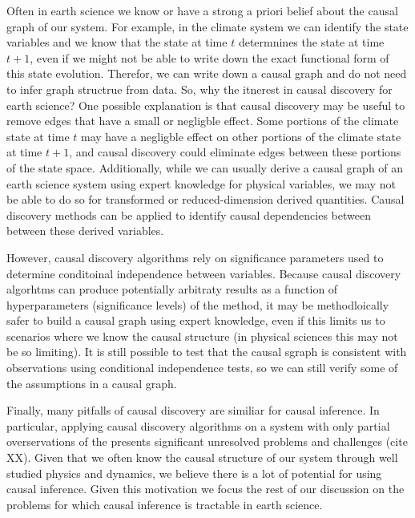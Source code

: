 \documentclass[12pt]{article}
\begin{document}

Often in earth science we know or have a strong a priori belief
about the causal graph of our system. For example, in the climate
system we can identify the state variables and we know that the
state at time \(t\) determnines the state at time \(t+1\), even if we
might not be able to write down the exact functional form of this
state evolution. Therefor, we can write down a causal graph and do
not need to infer graph structrue from data.  So, why the itnerest
in causal discovery for earth science? One possible explanation is
that causal discovery may be useful to remove edges that have a
small or negligble effect. Some portions of the climate state at
time \(t\) may have a negligble effect on other portions of the
climate state at time \(t+1\), and causal discovery could eliminate
edges between these portions of the state space.  Additionally,
while we can usually derive a causal graph of an earth science
system using expert knowledge for physical variables, we may not
be able to do so for transformed or reduced-dimension derived
quantities. Causal discovery methods can be applied to identify
causal dependencies between between these derived variables.


However, causal discovery algorithms rely on significance
parameters used to determine conditoinal independence between
variables. Because causal discovery algorhtms can produce
potentially arbitraty results as a function of hyperparameters
(significance levels) of the method, it may be methodloically
safer to build a causal graph using expert knowledge, even if this
limits us to scenarios where we know the causal structure (in
physical sciences this may not be so limiting). It is still
possible to test that the causal sgraph is consistent with
observations using conditional independence tests, so we can still
verify some of the assumptions in a causal graph.


Finally, many pitfalls of causal discovery are similiar for causal
inference. In particular, applying causal discovery algorithms on
a system with only partial overservations of the presents
significant unresolved problems and challenges (cite XX). Given
that we often know the causal structure of our system through well
studied physics and dynamics, we believe there is a lot of
potential for using causal inference. Given this motivation we
focus the rest of our discussion on the problems for which causal
inference is tractable in earth science.
\end{document}
